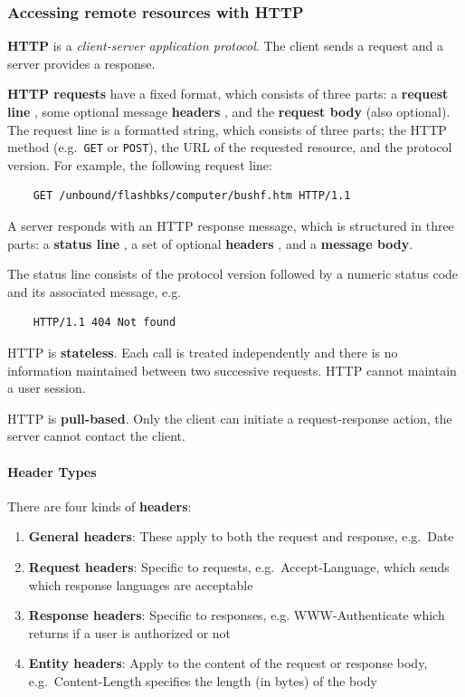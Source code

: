 \subsubsection{Accessing remote resources with HTTP}
\textbf{HTTP} is a \emph{client-server application protocol}. The client sends a request and a server provides a response.

\textbf{HTTP requests}  have a fixed format, which consists of three parts: a \textbf{request line} , some optional message \textbf{headers} , and the \textbf{request body}  (also optional).
The request line is a formatted string, which consists of three parts; the HTTP method (e.g.\ \texttt{GET} or \texttt{POST}), the URL of the requested resource, and the protocol version. For example, the following request line: 
\begin{verbatim}
    GET /unbound/flashbks/computer/bushf.htm HTTP/1.1
\end{verbatim}

A server responds with an HTTP response message, which is structured in three parts: a \textbf{status line} , a set of optional \textbf{headers} , and a \textbf{message body}.

The status line consists of the protocol version followed by a numeric status code and its associated message, e.g.

\begin{verbatim}
    HTTP/1.1 404 Not found
\end{verbatim}

HTTP is \textbf{stateless}. Each call is treated independently and there is no information maintained between two successive requests. HTTP cannot maintain a user session.

HTTP is \textbf{pull-based}. Only the client can initiate a request-response action, the server cannot contact the client.

\paragraph{Header Types }There are four kinds of \textbf{headers}:
\begin{enumerate}
    \item \textbf{General headers}: These apply to both the request and response, e.g.\ Date
    \item \textbf{Request headers}: Specific to requests, e.g.\ Accept-Language, which sends which response languages are acceptable
    \item \textbf{Response headers}: Specific to responses, e.g. WWW-Authenticate which returns if a user is authorized or not
    \item \textbf{Entity headers}: Apply to the content of the request or response body, e.g.\ Content-Length specifies the length (in bytes) of the body
\end{enumerate}

